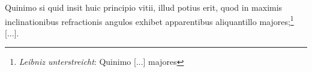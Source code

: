  \pstart [p.~27] Quinimo si quid insit huic principio vitii, illud potius erit, quod in maximis inclinationibus\protect{} refractionis angulos\protect{}\protect{} exhibet apparentibus aliquantillo majores;\footnote{\textit{Leibniz unterstreicht}: Quinimo [...] majores} [...].
 \pend